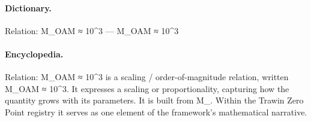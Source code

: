 \paragraph{Dictionary.}
Relation: M\_OAM ≈ 10\textasciicircum{}3 — M\_OAM ≈ 10\textasciicircum{}3

\paragraph{Encyclopedia.}
Relation: M\_OAM ≈ 10\textasciicircum{}3 is a scaling / order-of-magnitude relation, written M\_OAM ≈ 10\textasciicircum{}3. It expresses a scaling or proportionality, capturing how the quantity grows with its parameters. It is built from M\_. Within the Trawin Zero Point registry it serves as one element of the framework's mathematical narrative.

